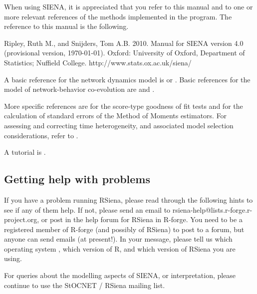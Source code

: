 \documentclass[a4paper,fleqn]{article}
\newcommand{\+}{\, + \,}
\newcommand{\Rn}{{\sf R}}
\newcommand{\rs}{{\sf RSiena}}
\newcommand{\RS}{{\sf RSiena }}
\newcommand{\SN}{{\sf StOCNET }}
\newcommand{\si}{{\sf SIENA}}
\begin{document}
{When using \si, it is appreciated that you refer to this manual and to one or
more relevant references of the methods implemented in the program.  The
reference to this manual is the following.  \smallskip

\noindent
Ripley, Ruth M., and Snijders, Tom A.B.
2010.
Manual for SIENA version 4.0 (provisional version, \today).
Oxford: University of Oxford, Department of Statistics; Nuffield College.
\textsf{http://www.stats.ox.ac.uk/siena/}

\smallskip

A basic reference for the network dynamics model is \citet{Snijders01}
or \citet{Snijders05}.
Basic references for the model of network-behavior co-evolution
are \citet*{SnijdersEA07} and \citet*{SteglichEA10}.

More specific references are \citet{Schweinberger10} for the score-type goodness
of fit tests and \citet{SchweinbergerSnijders07a} for the calculation of
standard errors of the Method of Moments estimators. For assessing and
correcting time heterogeneity, and associated model selection considerations,
refer to \citet*{Lospinoso2010a, Lospinoso2010b}.

A tutorial is \citet*{SnijdersEA10b}.


\subsection{Getting help with problems}
\label{sec:problems}
If you have a problem running \rs, please read through the following hints to
see if any of them help. If not, please send an email to
rsiena-help@lists.r-forge.r-project.org, or post in the help forum for \RS in
R-forge. You need to be a registered member of R-forge (and possibly of \rs)
to post to a forum, but anyone can send emails (at present!). In your message,
please tell us which operating system , which version of \Rn, and which version
of \RS you are using.

For queries about the modelling aspects of \si, or interpretation, please
continue to use the \SN/ \RS mailing list.


}
\end{document}
